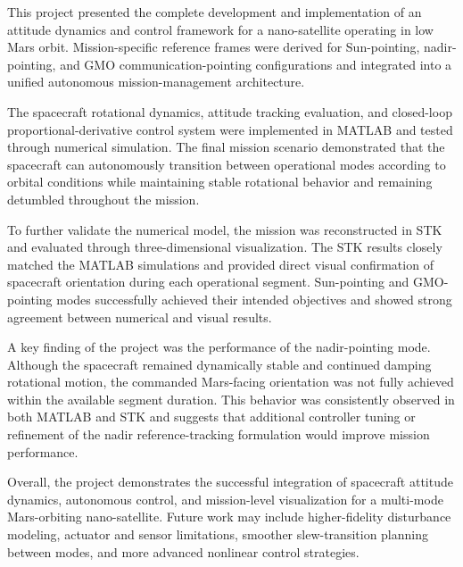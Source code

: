 \documentclass[12pt,a4paper]{report}
\begin{document}
	This project presented the complete development and implementation of an attitude dynamics and control framework for a nano-satellite operating in low Mars orbit. Mission-specific reference frames were derived for Sun-pointing, nadir-pointing, and GMO communication-pointing configurations and integrated into a unified autonomous mission-management architecture.
	
	The spacecraft rotational dynamics, attitude tracking evaluation, and closed-loop proportional-derivative control system were implemented in MATLAB and tested through numerical simulation. The final mission scenario demonstrated that the spacecraft can autonomously transition between operational modes according to orbital conditions while maintaining stable rotational behavior and remaining detumbled throughout the mission.
	
	To further validate the numerical model, the mission was reconstructed in STK and evaluated through three-dimensional visualization. The STK results closely matched the MATLAB simulations and provided direct visual confirmation of spacecraft orientation during each operational segment. Sun-pointing and GMO-pointing modes successfully achieved their intended objectives and showed strong agreement between numerical and visual results.
	
	A key finding of the project was the performance of the nadir-pointing mode. Although the spacecraft remained dynamically stable and continued damping rotational motion, the commanded Mars-facing orientation was not fully achieved within the available segment duration. This behavior was consistently observed in both MATLAB and STK and suggests that additional controller tuning or refinement of the nadir reference-tracking formulation would improve mission performance.
	
	Overall, the project demonstrates the successful integration of spacecraft attitude dynamics, autonomous control, and mission-level visualization for a multi-mode Mars-orbiting nano-satellite. Future work may include higher-fidelity disturbance modeling, actuator and sensor limitations, smoother slew-transition planning between modes, and more advanced nonlinear control strategies.
	
	
	
	\printbibliography
	
\end{document}
